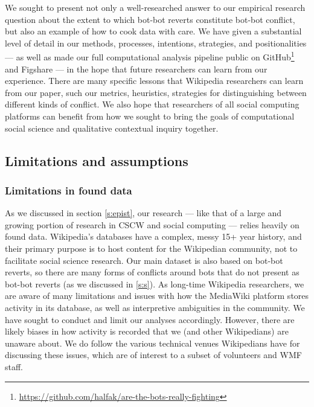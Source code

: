 \documentclass[format=acmsmall, review=false, screen=true]{acmart}%
\begin{document}
We sought to present not only a well-researched answer to our empirical research question about the extent to which bot-bot reverts constitute bot-bot conflict, but also an example of how to cook data with care. We have given a substantial level of detail in our methods, processes, intentions, strategies, and positionalities --- as well as made our full computational analysis pipeline public on GitHub\footnote{ \url{https://github.com/halfak/are-the-bots-really-fighting} } and Figshare \cite{figshare} --- in the hope that future researchers can learn from our experience. There are many specific lessons that Wikipedia researchers can learn from our paper, such our metrics, heuristics, strategies for distinguishing between different kinds of conflict. We also hope that researchers of all social computing platforms can benefit from how we sought to bring the goals of computational social science and qualitative contextual inquiry together.

\subsection{Limitations and assumptions}
\subsubsection{Limitations in found data}
As we discussed in section \ref{s:epist}, our research --- like that of a large and growing portion of research in CSCW and social computing --- relies heavily on found data. Wikipedia's databases have a complex, messy 15+ year history, and their primary purpose is to host content for the Wikipedian community, not to facilitate social science research. Our main dataset is also based on bot-bot reverts, so there are many forms of conflicts around bots that do not present as bot-bot reverts (as we discussed in \ref{s:s}). As long-time Wikipedia researchers, we are aware of many limitations and issues with how the MediaWiki platform stores activity in its database, as well as interpretive ambiguities in the community. We have sought to conduct and limit our analyses accordingly. However, there are likely biases in how activity is recorded that we (and other Wikipedians) are unaware about. We do follow the various technical venues Wikipedians have for discussing these issues, which are of interest to a subset of volunteers and WMF staff.
\end{document}
